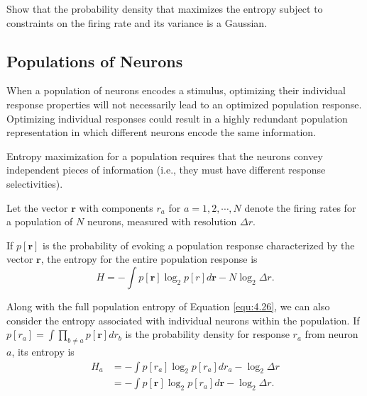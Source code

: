 \begin{exc}
  Show that the probability density that maximizes the entropy subject to constraints on the firing rate and its variance is a Gaussian.
\end{exc}


\subsection{Populations of Neurons}
\begin{rem}
  When a population of neurons encodes a stimulus, optimizing their individual response properties will not necessarily lead to an optimized population response. Optimizing individual responses could result in a highly redundant population representation in which different neurons encode the same information.
\end{rem}

\begin{fac}
  Entropy maximization for a population requires that the neurons convey independent pieces of information (i.e., they must have different response selectivities).
\end{fac}

\begin{ntn}
  Let the vector $\mathbf{r}$ with components $r_a$ for $a=1,2,\cdots,N$ denote the firing rates for a population of $N$ neurons, measured with resolution $\Delta r$. 
\end{ntn}

\begin{thm}
  If $p[\mathbf{r}]$ is the probability of evoking a population response characterized by the vector $\mathbf{r}$, the entropy for the entire
population response is
\begin{equation}
  \label{equ:4.26}
  H=-\int{p[\mathbf{r}]\log_2p[r]d\mathbf{r}}-N\log_2\Delta r.
\end{equation}
\end{thm}

\begin{prop}
  Along with the full population entropy of Equation \ref{equ:4.26}, we
  can also consider the entropy associated with individual neurons
  within the population. If $p[r_a]=\int\prod_{b\neq
    a}p[\mathbf{r}]dr_b$ is the probability density for response $r_{a}$ from
  neuron $a$, its entropy is
  \begin{equation}
    \begin{aligned}
       \label{equ:4.27}
    H_a&=-\int{p[r_a]\log_2p[r_a]dr_a}-\log_2{\Delta r}\\
        &=-\int{p[\mathbf{r}]\log_2p[r_a]d\mathbf{r}}-\log_2{\Delta r}.
    \end{aligned}
  \end{equation}
\end{prop}

